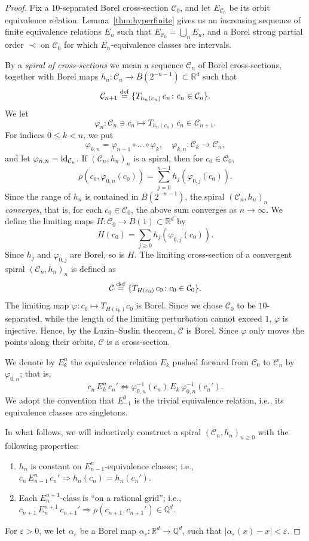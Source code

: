 \documentclass[11pt]{paper}
\newcommand{\bR}{\mathbb R}
\newcommand{\bQ}{\mathbb Q}
\newcommand{\cC}{\mathcal C}
\newcommand{\eps}{\varepsilon}
\begin{document}
\begin{proof}
Fix a $10$-separated Borel cross-section $\cC_0$, and let $E_{\cC_0}$
be its orbit equivalence relation. Lemma~\ref{thm:hyperfinite} gives us
an increasing sequence of finite equivalence relations $E_n$ such that
$E_{\cC_0}=\bigcup_n E_n$, and a Borel strong partial order $\prec$
on $\cC_0$ for which $E_n$-equivalence classes are intervals.

\smallskip
By a \emph{spiral of cross-sections} we mean a sequence $\cC_n$ of Borel cross-sections,
together with Borel maps $h_n\colon \cC_n\to B(2^{-n-1})\subset \bR^d$ such that
\[
\cC_{n+1}
\overset{\rm def}{=}\{ T_{h_n(c_n)}\,c_n\colon c_n\in\cC_{n}\}.
\]
We let \[ \varphi_{n}\colon \cC_n\ni c_n\mapsto T_{h_n(c_n)}\, c_n\in \cC_{n+1}. \]
For indices $0\le k< n$, we put
\[
\varphi_{k, n}=\varphi_{n-1}\circ\ldots\circ\varphi_{k}, \quad \varphi_{k, n}\colon \cC_k\to\cC_n,
\]
and let $\varphi_{n,n}={\rm id}_{\cC_n}$.
If $(\cC_n,h_n)_n$ is a spiral, then for $c_0\in\cC_0$,
\[
\rho(c_0, \varphi_{0,n}(c_0))=\sum_{j=0}^{n-1} h_j(\varphi_{0,j}(c_0)).
\]
Since the range of  $h_n$ is contained in $B(2^{-n-1})$,
the spiral  $(\cC_n,h_n)_n$ {\em converges}, that is, for each $c_0\in\cC_0$, the above sum
converges as $n\to\infty$. We define the limiting maps
$H\colon \cC_0\to B(1)\subset \bR^d$ by
\[
H(c_0)=\sum_{j\ge 0} h_j(\varphi_{0,j}(c_0)).
\]
Since $h_j$ and $\varphi_{0,j}$ are Borel, so is $H$.
The limiting cross-section of a convergent spiral
$(\cC_n,h_n)_n$ is defined as
\[
\cC
\overset{{\rm def}}{=} \{T_{H(c_0)}\, c_0\colon c_0\in\cC_0\}.
\]
The limiting map $ \varphi\colon c_0 \mapsto T_{H(c_0)} c_0$ is Borel.
Since we chose $\cC_0$ to be $10$-separated, while the length of the limiting
perturbation cannot exceed $1$, $\varphi$ is injective. Hence, by the Luzin--Suslin theorem,
$\cC$ is Borel. Since $\varphi$ only moves the points along their orbits, $\cC$ is a cross-section.

\smallskip
We denote by $E_k^n$ the equivalence relation $E_k$ pushed forward from $\cC_0$ to
$\cC_n$ by $\varphi_{0, n}$; that is,
\[
c_n\, E_k^n \,c_n'\Longleftrightarrow
\varphi^{-1}_{0,n}(c_n)\, E_k\, \varphi^{-1}_{0,n}(c_n').
\]
We adopt the convention that $E_{-1}^0$ is the trivial equivalence relation, i.e.,
its equivalence classes are singletons.

\smallskip
In what follows, we will inductively  construct a spiral $(\cC_n, h_n)_{n\ge 0}$
with the following properties:
\begin{enumerate}
\item[(1)] $h_n$ is constant on $E_{n-1}^{n}$-equivalence classes; i.e.,
$ c_n\, E_{n-1}^n\, c_n' \Longrightarrow h_n(c_n)=h_n(c_n')$.
\item[(2)] Each $E_{n}^{n+1}$-class is ``on a rational grid''; i.e.,
$ c_{n+1}\, E_{n}^{n+1}\, c_{n+1}' \Longrightarrow \rho(c_{n+1}, c_{n+1}')\in\bQ^d$.
\end{enumerate}
For $\eps>0$, we let $\alpha_\eps$ be a Borel map
$\alpha_\eps: \bR^d\to\bQ^d$, such that $|\alpha_\eps(x)-x| < \eps$.



\end{proof}
\end{document}
